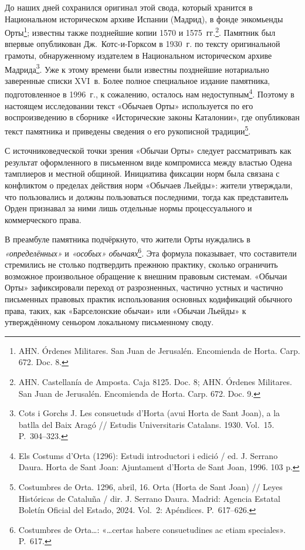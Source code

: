 До наших дней сохранился оригинал этой свода, который хранится в Национальном историческом архиве Испании (Мадрид), в фонде энкомьенды Орты\footnote{AHN. Órdenes Militares. San Juan de Jerusalén. Encomienda de Horta. Carp. 672. Doc. 8.}; известны также позднейшие копии 1570 и 1575~гг.\footnote{AHN. Castellanía de Amposta. Caja 8125. Doc. 8; AHN. Órdenes Militares. San Juan de Jerusalén. Encomienda de Horta. Carp. 672. Doc. 9.}. Памятник был впервые опубликован Дж.~Котс-и-Горксом в 1930~г. по тексту оригинальной грамоты, обнаруженному издателем в Национальном историческом архиве Мадрида\footnote{Cots i Gorchs J. Les consuetuds d’Horta (avui Horta de Sant Joan), a la batlla del Baix Aragó // Estudis Universitaris Catalans. 1930. Vol.~15. P.~304--323.}. Уже к этому времени были известны позднейшие нотариально заверенные списки XVI~в. Более полное специальное издание памятника, подготовленное в 1996~г., к сожалению, осталось нам недоступным\footnote{Els Costums d’Orta (1296): Estudi introductori i edició / ed. J. Serrano Daura. Horta de Sant Joan: Ajuntament d’Horta de Sant Joan, 1996. 103 p.}. Поэтому в настоящем исследовании текст «Обычаев Орты» используется по его воспроизведению в сборнике «Исторические законы Каталонии», где опубликован текст памятника и приведены сведения о его рукописной традиции\footnote{Costumbres de Orta. 1296, abril, 16. Orta (Horta de Sant Joan) // Leyes Históricas de Cataluña / dir. J. Serrano Daura. Madrid: Agencia Estatal Boletín Oficial del Estado, 2024. Vol.~2: Apéndices. P.~617--626.}.

С источниковедческой точки зрения «Обычаи Орты» следует рассматривать как результат оформленного в письменном виде компромисса между властью Одена тамплиеров и местной общиной. Инициатива фиксации норм была связана с конфликтом о пределах действия норм «Обычаев Льейды»: жители утверждали, что пользовались и должны пользоваться последними, тогда как представитель Орден признавал за ними лишь отдельные нормы процессуального и коммерческого права.

В преамбуле памятника подчёркнуто, что жители Орты нуждались в \emph{«определённых»} и \emph{«особых» обычаях}\footnote{Costumbres de Orta…: «…certas habere consuetudines ac etiam speciales». P.~617.}. Эта формула показывает, что составители стремились не столько подтвердить прежнюю практику, сколько ограничить возможное произвольное обращение к внешним правовым системам. «Обычаи Орты» зафиксировали переход от разрозненных, частично устных и частично письменных правовых практик использования основных кодификаций обычного права, таких, как «Барселонские обычаи» или «Обычаи Льейды» к утверждённому сеньором локальному письменному своду.

